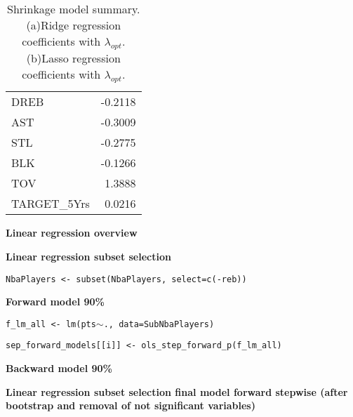 \begin{table}[H]
\begin{subtable}[h]{0.4\textwidth}
\begin{tabular}{|| l | r ||}
			DREB & -0.2118 \\
			AST & -0.3009 \\
			STL & -0.2775 \\
			BLK & -0.1266 \\
			TOV & 1.3888 \\ 
			TARGET\_5Yrs & 0.0216 \\				
			\hline
		\end{tabular}
		\caption{}
		\label{table:FinalLassoCoef}
	\end{subtable}
	\caption{Shrinkage model summary. (a)Ridge regression coefficients with $\lambda_{opt}$. (b)Lasso regression coefficients with $\lambda_{opt}$.}
	\label{table:RegModSum}
\end{table}

\textbf{Linear regression overview}

\begin{center}



\end{center}
	
\noindent
\textbf{Linear regression subset selection}

\begin{center}
\texttt{NbaPlayers <- subset(NbaPlayers, select=c(-reb))}

\textbf{Forward model 90\%}

\texttt{f\_lm\_all <- lm(pts$\sim$., data=SubNbaPlayers)}

\texttt{sep\_forward\_models[[i]] <- ols\_step\_forward\_p(f\_lm\_all)}

\textbf{Backward model 90\%}


\end{center}
	
\noindent
\textbf{Linear regression subset selection final model forward stepwise (after bootstrap and removal of not significant variables)}

